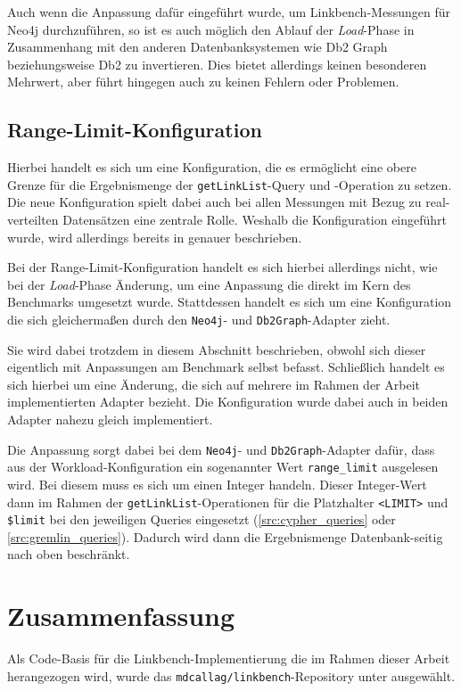 Auch wenn die Anpassung dafür eingeführt wurde, um Linkbench-Messungen für Neo4j durchzuführen, so ist es auch möglich den Ablauf der \textit{Load}-Phase in Zusammenhang mit den anderen Datenbanksystemen wie Db2 Graph beziehungsweise Db2 zu invertieren. Dies bietet allerdings keinen besonderen Mehrwert, aber führt hingegen auch zu keinen Fehlern oder Problemen.  

\subsection{Range-Limit-Konfiguration}
Hierbei handelt es sich um eine Konfiguration, die es ermöglicht eine obere Grenze für die Ergebnismenge der \texttt{getLinkList}-Query und -Operation zu setzen. Die neue Konfiguration spielt dabei auch bei allen Messungen mit Bezug zu real-verteilten Datensätzen eine zentrale Rolle. Weshalb die Konfiguration eingeführt wurde, wird allerdings bereits in   genauer beschrieben. 

Bei der Range-Limit-Konfiguration handelt es sich hierbei allerdings nicht, wie bei der \textit{Load}-Phase Änderung, um eine Anpassung die direkt im Kern des Benchmarks umgesetzt wurde. Stattdessen handelt es sich um eine Konfiguration die sich gleichermaßen durch den \texttt{Neo4j}- und \texttt{Db2Graph}-Adapter zieht. 

Sie wird dabei trotzdem in diesem Abschnitt beschrieben, obwohl sich dieser eigentlich mit Anpassungen am Benchmark selbst befasst. Schließlich handelt es sich hierbei um eine Änderung, die sich auf mehrere im Rahmen der Arbeit implementierten Adapter bezieht. Die Konfiguration wurde dabei auch in beiden Adapter nahezu gleich implementiert. 

Die Anpassung sorgt dabei bei dem \texttt{Neo4j}- und \texttt{Db2Graph}-Adapter dafür, dass aus der Workload-Konfiguration ein sogenannter Wert \texttt{range\_limit} ausgelesen wird. Bei diesem muss es sich um einen Integer handeln. Dieser Integer-Wert dann im Rahmen der \texttt{getLinkList}-Operationen für die Platzhalter \texttt{<LIMIT>} und \texttt{\$limit} bei den jeweiligen Queries eingesetzt (\autoref{src:cypher_queries} oder \autoref{src:gremlin_queries}). Dadurch wird dann die Ergebnismenge Datenbank-seitig nach oben beschränkt. 

\section{Zusammenfassung}
Als Code-Basis für die Linkbench-Implementierung die im Rahmen dieser Arbeit herangezogen wird, wurde das \texttt{mdcallag/linkbench}-Repository unter \cite{mc_linkbench_github} ausgewählt.

